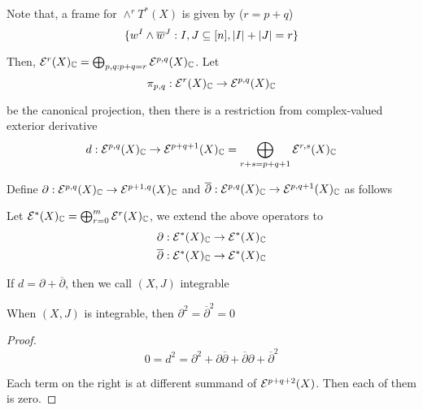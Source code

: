 \begin{definition}[$\partial$, $\overline{\partial}$]
	Note that, a frame for $\wedge^r T^*(X)$ is given by ($r = p+q$)
	$$
		\{w^I \wedge \overline{w}^J: I, J \subseteq [n], |I| + |J| = r\}
	$$
	
	Then, $\mathcal{E}^r(X)_{\mathbb{C}} = \bigoplus_{p, q: p + q = r} \mathcal{E}^{p, q}(X)_{\mathbb{C}}$. Let 
	$$
		\pi_{p,q}: \mathcal{E}^r(X)_{\mathbb{C}} \to \mathcal{E}^{p,q}(X)_{\mathbb{C}}
	$$
	
	be the canonical projection, then there is a restriction from complex-valued exterior derivative
	$$
		d: \mathcal{E}^{p,q}(X)_{\mathbb{C}} \to \mathcal{E}^{p+q+1}(X)_{\mathbb{C}} = \bigoplus_{r+s = p+q+1} \mathcal{E}^{r, s}(X)_{\mathbb{C}}
	$$
	
	Define $\partial: \mathcal{E}^{p,q}(X)_{\mathbb{C}} \to \mathcal{E}^{p+1,q}(X)_{\mathbb{C}}$ and  $\overline{\partial}: \mathcal{E}^{p,q}(X)_{\mathbb{C}} \to \mathcal{E}^{p,q+1}(X)_{\mathbb{C}}$ as follows
	\begin{center}
	\end{center}
	
	Let $\mathcal{E}^*(X)_{\mathbb{C}} = \bigoplus_{r=0}^m \mathcal{E}^r(X)_{\mathbb{C}}$, we extend the above operators to
	\begin{align*}
		\partial&: \mathcal{E}^*(X)_{\mathbb{C}} \to \mathcal{E}^*(X)_{\mathbb{C}} \\
		\overline{\partial}&: \mathcal{E}^*(X)_{\mathbb{C}} \to \mathcal{E}^*(X)_{\mathbb{C}}
	\end{align*}
\end{definition}

\begin{definition}
	If $d = \partial + \overline{\partial}$, then we call $(X, J)$ integrable
\end{definition}

\begin{proposition}
	When $(X, J)$ is integrable, then $\partial^2 =\overline{\partial}^2 = 0$
	\begin{proof}
		$$
			0  = d^2 = \partial^2 + \partial \overline{\partial} + \overline{\partial} \partial + \overline{\partial}^2
		$$
		
 		Each term on the right is at different summand of $\mathcal{E}^{p+q+2}(X)$. Then each of them is zero.
	\end{proof}
\end{proposition}

